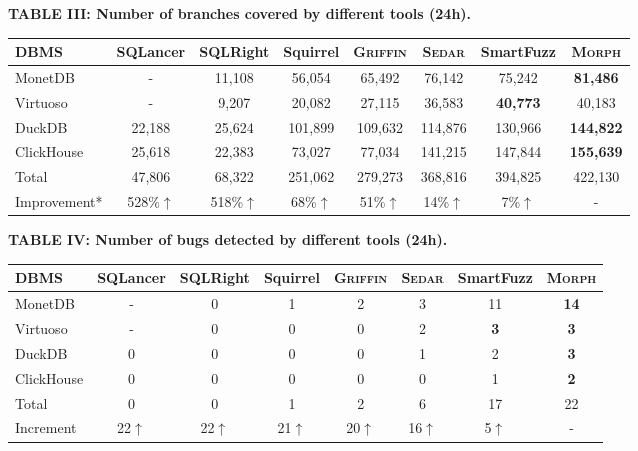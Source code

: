 \documentclass[12pt,letterpaper]{article}
\renewcommand{\arraystretch}{1.15}
\newcommand{\morph}{\textsc{Morph}}
\newcommand{\sedar}{\textsc{Sedar}}
\newcommand{\griffin}{\textsc{Griffin}}
\newcommand{\tool}{\morph}
\begin{document}
\begin{center}
\begin{minipage}{0.92\linewidth}
\centering\scriptsize\renewcommand{\arraystretch}{1.0}\setlength{\tabcolsep}{3pt}
\textbf{TABLE III: Number of branches covered by different tools (24h).}
\par\smallskip
\begin{tabular}{lccccccc}
\toprule
DBMS & SQLancer & SQLRight & Squirrel & \griffin{} & \sedar{} & SmartFuzz & \tool{} \\
\midrule
MonetDB & - & 11,108 & 56,054 & 65,492 & 76,142 & 75,242 & \textbf{81,486} \\
Virtuoso & - & 9,207 & 20,082 & 27,115 & 36,583 & \textbf{40,773} & 40,183 \\
DuckDB & 22,188 & 25,624 & 101,899 & 109,632 & 114,876 & 130,966 & \textbf{144,822} \\
ClickHouse & 25,618 & 22,383 & 73,027 & 77,034 & 141,215 & 147,844 & \textbf{155,639} \\
\midrule
Total & 47,806 & 68,322 & 251,062 & 279,273 & 368,816 & 394,825 & 422,130 \\
Improvement* & 528\%$\uparrow$ & 518\%$\uparrow$ & 68\%$\uparrow$ & 51\%$\uparrow$ & 14\%$\uparrow$ & 7\%$\uparrow$ & - \\
\bottomrule
\end{tabular}
\par{}
\end{minipage}
\end{center}

\begin{center}
\begin{minipage}{0.92\linewidth}
\centering\scriptsize\renewcommand{\arraystretch}{1.0}\setlength{\tabcolsep}{3pt}
\textbf{TABLE IV: Number of bugs detected by different tools (24h).}
\par\smallskip
\begin{tabular}{lccccccc}
\toprule
DBMS & SQLancer & SQLRight & Squirrel & \griffin{} & \sedar{} & SmartFuzz & \tool{} \\
\midrule
MonetDB & - & 0 & 1 & 2 & 3 & 11 & \textbf{14} \\
Virtuoso & - & 0 & 0 & 0 & 2 & \textbf{3} & \textbf{3} \\
DuckDB & 0 & 0 & 0 & 0 & 1 & 2 & \textbf{3} \\
ClickHouse & 0 & 0 & 0 & 0 & 0 & 1 & \textbf{2} \\
\midrule
Total & 0 & 0 & 1 & 2 & 6 & 17 & 22 \\
Increment & 22$\uparrow$ & 22$\uparrow$ & 21$\uparrow$ & 20$\uparrow$ & 16$\uparrow$ & 5$\uparrow$ & - \\
\bottomrule
\end{tabular}

\end{minipage}
\end{center}
\end{document}
